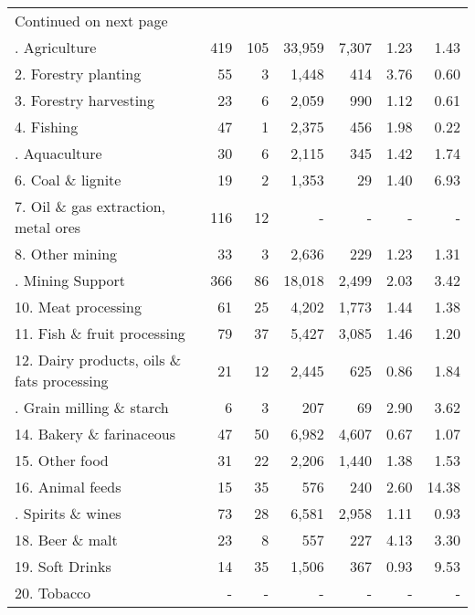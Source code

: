 {\begin{center}
\begin{longtable}{lrrrrrr}
\hline \endhead \bottomrule \multicolumn{2}{l}{{Continued on next page}} \\ 
\endfoot \bottomrule \endlastfoot
     1. Agriculture & 419   & 105   & 33,959 & 7,307 & 1.23  & 1.43 \\
    2. Forestry planting & 55    & 3     & 1,448 & 414   & 3.76  & 0.60 \\
    3. Forestry harvesting & 23    & 6     & 2,059 & 990   & 1.12  & 0.61 \\
    4. Fishing & 47    & 1     & 2,375 & 456   & 1.98  & 0.22 \bigstrut[b]\\
     \hdashline[1pt/1pt]
    5. Aquaculture & 30    & 6     & 2,115 & 345   & 1.42  & 1.74 \bigstrut[t]\\
    6. Coal \& lignite & 19    & 2     & 1,353 & 29    & 1.40  & 6.93 \\
    7. Oil \& gas extraction, metal ores & 116   & 12    & -     & -     & -     & - \\
    8. Other mining & 33    & 3     & 2,636 & 229   & 1.23  & 1.31 \bigstrut[b]\\
     \hdashline[1pt/1pt]
    9. Mining Support & 366   & 86    & 18,018 & 2,499 & 2.03  & 3.42 \bigstrut[t]\\
    10. Meat processing & 61    & 25    & 4,202 & 1,773 & 1.44  & 1.38 \\
    11. Fish \& fruit processing & 79    & 37    & 5,427 & 3,085 & 1.46  & 1.20 \\
    12. Dairy products, oils \& fats processing & 21    & 12    & 2,445 & 625   & 0.86  & 1.84 \bigstrut[b]\\
     \hdashline[1pt/1pt]
    13. Grain milling \& starch & 6     & 3     & 207   & 69    & 2.90  & 3.62 \bigstrut[t]\\
    14. Bakery \& farinaceous & 47    & 50    & 6,982 & 4,607 & 0.67  & 1.07 \\
    15. Other food & 31    & 22    & 2,206 & 1,440 & 1.38  & 1.53 \\
    16. Animal feeds & 15    & 35    & 576   & 240   & 2.60  & 14.38 \bigstrut[b]\\
     \hdashline[1pt/1pt]
    17. Spirits \& wines & 73    & 28    & 6,581 & 2,958 & 1.11  & 0.93 \bigstrut[t]\\
    18. Beer \& malt & 23    & 8     & 557   & 227   & 4.13  & 3.30 \\
    19. Soft Drinks & 14    & 35    & 1,506 & 367   & 0.93  & 9.53 \\
    20. Tobacco & -     & -     & -     & -     & -     & - \bigstrut[b]\\

\end{longtable}
\end{center}}
